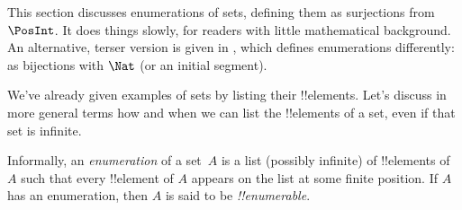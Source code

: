 \documentclass[../../../include/open-logic-section]{subfiles}
\begin{document}


\begin{editorial}
  This section discusses enumerations of sets, defining them as
  surjections from $\PosInt$. It does things slowly, for readers with
  little mathematical background. An alternative, terser
  version is given in , which defines enumerations
  differently: as bijections with $\Nat$ (or an initial segment).
\end{editorial}

\begin{explain}
We've already given examples of sets by listing their !!{element}s.
Let's discuss in more general terms how and when we can list the
!!{element}s of a set, even if that set is infinite.
\end{explain}

\begin{defn}
Informally, an \emph{enumeration} of a set~$A$ is a list (possibly
infinite) of !!{element}s of~$A$ such that every !!{element} of $A$
appears on the list at some finite position. If $A$ has an
enumeration, then $A$ is said to be \emph{!!{enumerable}}.
\end{defn}
\end{document}
